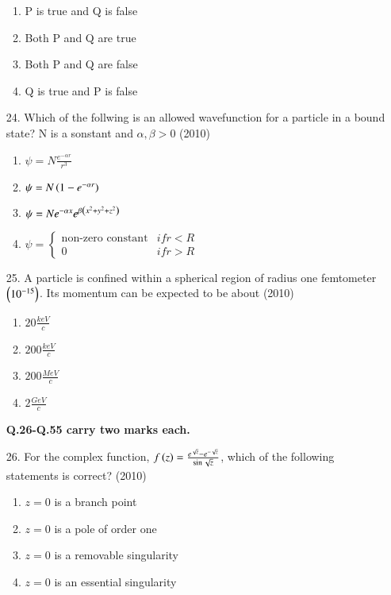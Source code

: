 \documentclass[journal]{IEEEtran}
\begin{document}
\begin{enumerate}
     \begin{enumerate}[label=(\Alph*)]
        \item P is true and Q is false
        \item Both P and Q are true 
        \item Both P and Q are false
        \item Q is true and P is false
     \end{enumerate}
    \item[24.] Which of the follwing is an allowed wavefunction for a particle in a bound state? N is a sonstant and $\alpha,\beta>0$ \hfill (2010)
    \begin{enumerate}[label=(\Alph*)]
        \item $\psi=N\frac{e^{-\alpha r}}{r^3}$
        \item $\psi=N\left(1-e^{-\alpha r}\right)$
        \item $\psi=Ne^{-\alpha x}e^{\beta\left(x^2+y^2+z^2\right)}$
        \item $\psi=\begin{cases}\text{non-zero constant} & if r<R\\0 & if r>R\end{cases}$
    \end{enumerate}
    \item[25.] A particle is confined within a spherical region of radius one femtometer $\left(10^{-15}\right)$. Its momentum can be expected to be about \hfill (2010)
    \begin{enumerate}[label=(\Alph*)]
        \item $20\frac{keV}{c}$
        \item $200\frac{keV}{c}$
        \item $200\frac{MeV}{c}$
        \item $2\frac{GeV}{c}$
    \end{enumerate}
    \textbf{Q.26-Q.55 carry two marks each.}
    \item[26.] For the complex function, $f\left(z\right)=\frac{e^{\sqrt{z}}-e^{-\sqrt{z}}}{\sin \sqrt{z}}$, which of the following statements is correct? \hfill (2010)
    \begin{enumerate}[label=(\Alph*)]
        \item $z=0$ is a branch point
        \item $z=0$ is a pole of order one
        \item $z=0$ is a removable singularity
        \item $z=0$ is an essential singularity
    \end{enumerate} 
\end{enumerate}
\end{document}
